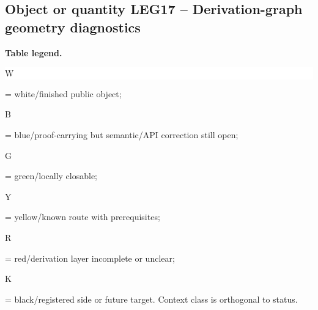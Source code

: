 \subsection*{Object or quantity LEG17 -- Derivation-graph geometry diagnostics}
\hypertarget{objproof:LEG17}{}
\par\smallskip\noindent\begin{minipage}{0.99\linewidth}\footnotesize\raggedright\textbf{Table legend.} \colorbox{white}{\strut W} = white/finished public object; \colorbox{cyan!20}{\strut B} = blue/proof-carrying but semantic/API correction still open; \colorbox{green!18}{\strut G} = green/locally closable; \colorbox{yellow!25}{\strut Y} = yellow/known route with prerequisites; \colorbox{red!20}{\strut R} = red/derivation layer incomplete or unclear; \colorbox{black!18}{\strut K} = black/registered side or future target. Context class is orthogonal to status.\end{minipage}\par\vspace{0.25em}
